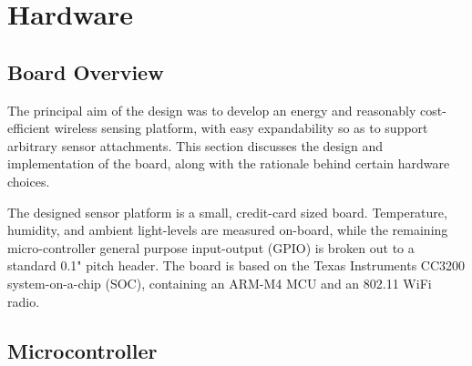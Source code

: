 \chapter{Hardware}


\section{Board Overview}
The principal aim of the design was to develop an energy and reasonably cost-efficient wireless sensing platform, with easy expandability so as to support arbitrary sensor attachments. This section discusses the design and implementation of the board, along with the rationale behind certain hardware choices.

The designed sensor platform is a small, credit-card sized board. Temperature, humidity, and ambient light-levels are measured on-board, while the remaining micro-controller general purpose input-output (GPIO) is broken out to a standard 0.1" pitch header. The board is based on the Texas Instruments CC3200 system-on-a-chip (SOC), containing an ARM-M4 MCU and an 802.11 WiFi radio.

\section{Microcontroller}

\begin{table}[h]
\caption{Microcontroller comparison}
\label{uc-comparison}
\end{table}

